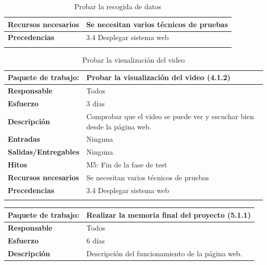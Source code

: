 \documentclass{report}
\begin{document}
\begin{center}
\begin{longtable}{|p{6cm}|p{6cm}|}
                    \hline
                    \textbf{Recursos necesarios} & Se necesitan varios técnicos de pruebas\\
                    \hline
                    \textbf{Precedencias} & 3.4 Desplegar sistema web\\
                    \hline
                    \caption{Probar la recogida de datos}
                \end{longtable}
                \clearpage
                \begin{longtable}{|p{6cm}|p{6cm}|}
                    \hline
                    \textbf{Paquete de trabajo:} & Probar la visualización del video (4.1.2)\\
                    \hline
                    \textbf{Responsable} & Todos\\
                    \hline
                    \textbf{Esfuerzo} & 3 días\\
                    \hline
                    \textbf{Descripción} & Comprobar que el video se puede ver y escuchar bien desde la página web.\\
                    \hline
                    \textbf{Entradas} & Ninguna\\
                    \hline
                    \textbf{Salidas/Entregables} & Ninguna \\
                    \hline
                    \textbf{Hitos} & M5: Fin de la fase de test\\
                    \hline
                    \textbf{Recursos necesarios} & Se necesitan varios técnicos de pruebas\\
                    \hline
                    \textbf{Precedencias} & 3.4 Desplegar sistema web\\
                    \hline
                    \caption{Probar la visualización del video}
                \end{longtable}
                \begin{longtable}{|p{6cm}|p{6cm}|}
                    \hline
                    \textbf{Paquete de trabajo:} & Realizar la memoria final del proyecto (5.1.1)\\
                    \hline
                    \textbf{Responsable} & Todos\\
                    \hline
                    \textbf{Esfuerzo} & 6 días\\
                    \hline
                    \textbf{Descripción} & Descripción del funcionamiento de la página web.\\

\end{longtable}
\end{center}
\end{document}
